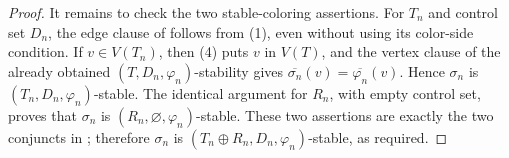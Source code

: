 \begin{proof}
It remains to check the two stable-coloring assertions.  For $T_n$ and
control set $D_n$, the edge clause of  follows
from (1), even without using its color-side condition.  If
$v\in V(T_n)$, then (4) puts $v$ in $V(T)$, and the vertex clause of the
already obtained $(T,D_n,\varphi_n)$-stability gives
$\overline{\sigma_n}(v)=\overline{\varphi_n}(v)$.  Hence $\sigma_n$ is
$(T_n,D_n,\varphi_n)$-stable.  The identical argument for $R_n$, with
empty control set, proves that $\sigma_n$ is
$(R_n,\varnothing,\varphi_n)$-stable.  These two assertions are exactly
the two conjuncts in ; therefore
$\sigma_n$ is $(T_n\oplus R_n,D_n,\varphi_n)$-stable, as required.
\end{proof}
